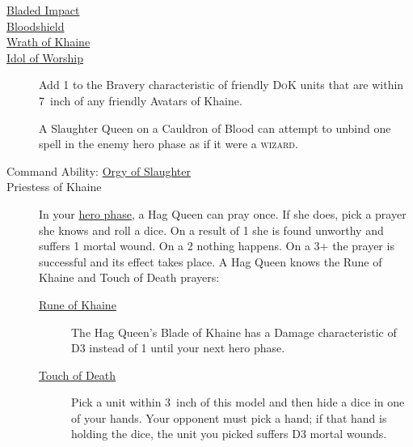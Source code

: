 \begin{description}
    \item [{\hyperref[bladed-impact]{Bladed Impact}}] 
    \item [{\hyperref[bloodshield]{Bloodshield}}]
    \item [{\hyperref[wrath-of-khaine]{Wrath of Khaine}}] 
    \item [{\hyperref[idol-of-worship]{Idol of Worship}}] Add 1 to the Bravery
        characteristic of friendly \textsc{DoK} units that are within 7~inch
        of any friendly Avatars of Khaine.
    \item [] A Slaughter Queen on
        a Cauldron of Blood can attempt to unbind one spell in the enemy hero
        phase as if it were a \textsc{wizard}.
    \item [Command Ability: {\hyperref[orgy-of-slaughter]{Orgy of Slaughter}}] 
    \item [Priestess of Khaine] In your \hyperref[hero-phase]{hero phase},
        a Hag Queen can pray once. If she does, pick a prayer she knows and
        roll a dice. On a result of 1 she is found unworthy and suffers
        1 mortal wound. On a 2 nothing happens. On a 3+ the prayer is
        successful and its effect takes place.  A Hag Queen knows the Rune of
        Khaine and Touch of Death prayers:
        \begin{description}
            \item [{\hyperref[rune-of-khaine]{Rune of Khaine}}] The Hag Queen's
                Blade of Khaine has a Damage characteristic of D3 instead of
                1 until your next hero phase.
            \item [{\hyperref[touch-of-death]{Touch of Death}}] Pick a unit within
                3~inch of this model and then hide a dice in one of your hands.
                Your opponent must pick a hand; if that hand is holding the
                dice, the unit you picked suffers D3 mortal wounds.
        \end{description}
\end{description}


